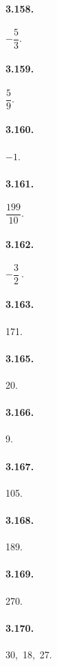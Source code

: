 \begin{multicols}{2}
\paragraph{3.158.}
$-\dfrac{5}{3}$.

\paragraph{3.159.}
$\dfrac{5}{9}$.

\paragraph{3.160.}
$-1$.

\paragraph{3.161.}
$\dfrac{199}{10}$.

\paragraph{3.162.}
$-\dfrac{3}{2}~$.

\paragraph{3.163.} 171.

\paragraph{3.165.} 20.

\paragraph{3.166.} 9.

\paragraph{3.167.} 105.

\paragraph{3.168.} 189.

\paragraph{3.169.} 270.

\paragraph{3.170.} 30,~18,~27.


\end{multicols}
